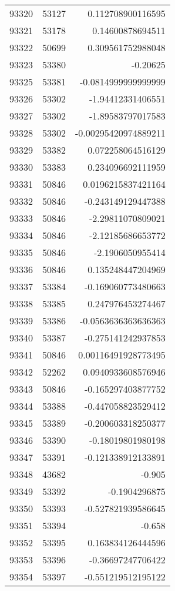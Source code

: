 \begin{tabular}{r | r | r}
93320 & 53127 & 0.112708900116595 \\
93321 & 53178 & 0.14600878694511 \\
93322 & 50699 & 0.309561752988048 \\
93323 & 53380 & -0.20625 \\
93325 & 53381 & -0.0814999999999999 \\
93326 & 53302 & -1.94412331406551 \\
93327 & 53302 & -1.89583797017583 \\
93328 & 53302 & -0.00295420974889211 \\
93329 & 53382 & 0.072258064516129 \\
93330 & 53383 & 0.234096692111959 \\
93331 & 50846 & 0.0196215837421164 \\
93332 & 50846 & -0.243149129447388 \\
93333 & 50846 & -2.29811070809021 \\
93334 & 50846 & -2.12185686653772 \\
93335 & 50846 & -2.1906050955414 \\
93336 & 50846 & 0.135248447204969 \\
93337 & 53384 & -0.169060773480663 \\
93338 & 53385 & 0.247976453274467 \\
93339 & 53386 & -0.0563636363636363 \\
93340 & 53387 & -0.275141242937853 \\
93341 & 50846 & 0.00116491928773495 \\
93342 & 52262 & 0.0940933608576946 \\
93343 & 50846 & -0.165297403877752 \\
93344 & 53388 & -0.447058823529412 \\
93345 & 53389 & -0.200603318250377 \\
93346 & 53390 & -0.18019801980198 \\
93347 & 53391 & -0.121338912133891 \\
93348 & 43682 & -0.905 \\
93349 & 53392 & -0.1904296875 \\
93350 & 53393 & -0.527821939586645 \\
93351 & 53394 & -0.658 \\
93352 & 53395 & 0.163834126444596 \\
93353 & 53396 & -0.36697247706422 \\
93354 & 53397 & -0.551219512195122 \\

\end{tabular}
